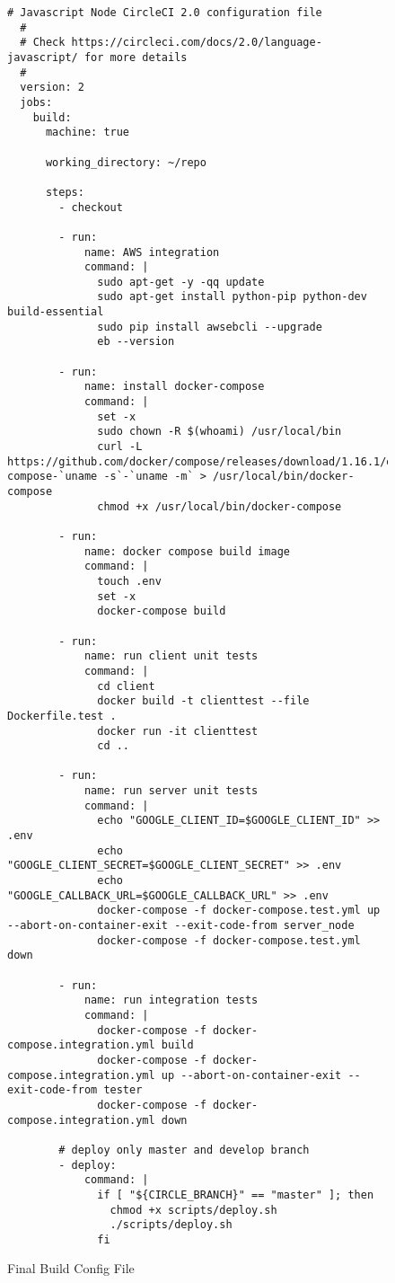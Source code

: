 \begin{figure}[h!]
  \begin{lstlisting}[basicstyle=\tiny, breaklines=true]
  # Javascript Node CircleCI 2.0 configuration file
  #
  # Check https://circleci.com/docs/2.0/language-javascript/ for more details
  #
  version: 2
  jobs:
    build:
      machine: true

      working_directory: ~/repo

      steps:
        - checkout

        - run:
            name: AWS integration
            command: |
              sudo apt-get -y -qq update
              sudo apt-get install python-pip python-dev build-essential
              sudo pip install awsebcli --upgrade
              eb --version

        - run:
            name: install docker-compose
            command: |
              set -x
              sudo chown -R $(whoami) /usr/local/bin
              curl -L https://github.com/docker/compose/releases/download/1.16.1/docker-compose-`uname -s`-`uname -m` > /usr/local/bin/docker-compose
              chmod +x /usr/local/bin/docker-compose

        - run:
            name: docker compose build image
            command: |
              touch .env
              set -x
              docker-compose build

        - run:
            name: run client unit tests
            command: |
              cd client
              docker build -t clienttest --file Dockerfile.test .
              docker run -it clienttest
              cd ..

        - run:
            name: run server unit tests
            command: |
              echo "GOOGLE_CLIENT_ID=$GOOGLE_CLIENT_ID" >> .env
              echo "GOOGLE_CLIENT_SECRET=$GOOGLE_CLIENT_SECRET" >> .env
              echo "GOOGLE_CALLBACK_URL=$GOOGLE_CALLBACK_URL" >> .env
              docker-compose -f docker-compose.test.yml up --abort-on-container-exit --exit-code-from server_node
              docker-compose -f docker-compose.test.yml down

        - run:
            name: run integration tests
            command: |
              docker-compose -f docker-compose.integration.yml build
              docker-compose -f docker-compose.integration.yml up --abort-on-container-exit --exit-code-from tester
              docker-compose -f docker-compose.integration.yml down

        # deploy only master and develop branch
        - deploy:
            command: |
              if [ "${CIRCLE_BRANCH}" == "master" ]; then
                chmod +x scripts/deploy.sh
                ./scripts/deploy.sh
              fi
  \end{lstlisting}
  \caption{Final Build Config File}
  \label{sample:circlecifinal}
\end{figure}

